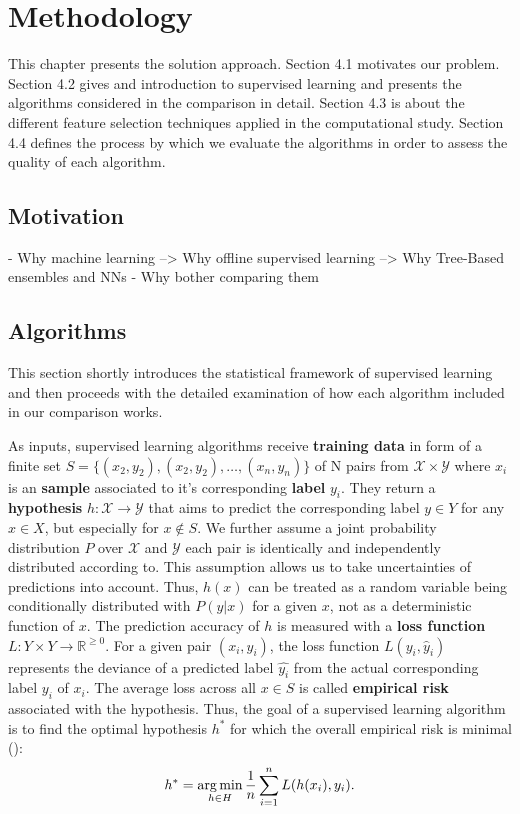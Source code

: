 \chapter{Methodology}
This chapter presents the solution approach.
Section 4.1 motivates our problem. 
Section 4.2 gives and introduction to supervised learning and presents the algorithms considered in the comparison in detail.
Section 4.3 is about the different feature selection techniques applied in the computational study. 
Section 4.4 defines the process by which we evaluate the algorithms in order to assess the quality of each algorithm.

\section{Motivation}

- Why machine learning --> Why offline supervised learning --> Why Tree-Based ensembles and NNs
- Why bother comparing them


\section{Algorithms}

This section shortly introduces the statistical framework of supervised learning and then proceeds with the detailed examination of how each algorithm included in our comparison works.  

As inputs, supervised learning algorithms receive \textbf{training data} in form of a finite set $ S = \{({x}_{2}, y_2), ({x}_{2}, y_2), \dots, ({x}_{n}, y_n)\}$ of N pairs from $ \mathcal{X} \times \mathcal{Y} $ where $ x_i $ is an \textbf{sample} associated to it's corresponding \textbf{label} $ y_i $.
They return a \textbf{hypothesis} $ h: \mathcal{X} \to \mathcal{Y} $ that aims to predict the corresponding label $ y \in Y $ for any $ x \in X $, but especially for $ x \notin S $.
We further assume a joint probability distribution $ P $ over $ \mathcal{X} $ and $ \mathcal{Y} $ each pair is identically and independently distributed according to. 
This assumption allows us to take uncertainties of predictions into account.
Thus, $ h(x) $ can be treated as a random variable being conditionally distributed with $ P(y | x) $ for a given $ x $, not as a deterministic function of $ x $.
The prediction accuracy of $ h $ is measured with a  \textbf{loss function} $ L : Y \times Y \to \mathbb{R}^{\geq 0}$.
For a given pair $ ({x}_i, y_i) $, the loss function $ L(y_i, \hat{y}_i) $ represents the deviance of a predicted label $ \hat{y_i} $ from the actual corresponding label $ y_i $ of $ x_i $. 
The average loss across all $ x \in S $ is called \textbf{empirical risk} associated with the hypothesis.
Thus, the goal of a supervised learning algorithm is to find the optimal hypothesis $ h^* $ for which the overall empirical risk is minimal (\cite{SLFoundations}): 
\begin{equation}
	h^* = \operatorname*{arg\,min}_{h \in H} \dfrac{1}{n} \sum_{i=1}^{n} L(h(x_i), y_i).
\end{equation}

